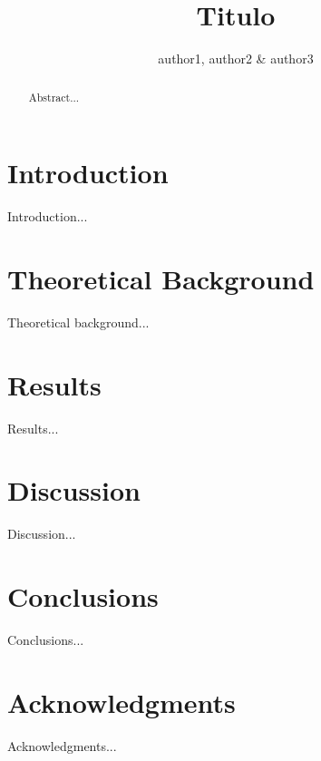 \documentclass{latex/emulateapj}
\begin{document}
\title{Titulo}


\author{author1, author2 \& author3} 



\begin{abstract}

Abstract...

\end{abstract}

\section{Introduction}
\label{sec:intro}

Introduction... \\ 


\section{Theoretical Background}
\label{sec:theo}

Theoretical background...\\


\section{Results}
\label{sec:results}

Results...\\


\section{Discussion}
\label{sec:discussion}

Discussion...\\


\section{Conclusions}
\label{sec:conclusions}

Conclusions...\\


\section*{Acknowledgments}

Acknowledgments...\\






\newpage
\end{document}
